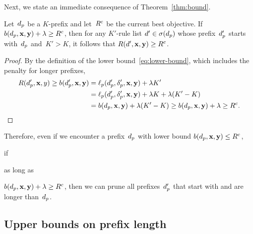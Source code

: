 Next, we state an immediate consequence of Theorem~\ref{thm:bound}.

\begin{lemma}
\label{lemma:lookahead}
Let~$d_p$ be a $K$-prefix
and let~${R^c}$ be the current best objective.
%
If ${b(d_p, \mathbf{x}, \mathbf{y}) + {\lambda} \ge {R^c}}$,
then for any $K'$-rule list ${{d}' \in \sigma(d_p)}$
whose prefix~$d_p'$ starts with~$d_p$ and~${K' > K}$,
it follows that ${R({d}', \mathbf{x}, \mathbf{y}) \ge {R^c}}$.
\end{lemma}

\begin{arxiv}
\begin{proof}
By the definition of the lower bound~\eqref{eq:lower-bound},
which includes the penalty for longer prefixes,
\begin{align}
R(d_p', \mathbf{x}, y) \ge b(d_p', \mathbf{x}, \mathbf{y}) &= \ell_p(d_p', \delta_p', \mathbf{x}, \mathbf{y}) + {\lambda} K' \nonumber \\
&= \ell_p(d_p', \delta_p', \mathbf{x}, \mathbf{y}) + {\lambda} K + {\lambda} (K' - K) \nonumber \\
&= b(d_p, \mathbf{x}, \mathbf{y}) + {\lambda} (K' - K)
\ge b(d_p, \mathbf{x}, \mathbf{y}) + {\lambda} \ge {R^c}.
\label{eq:lookahead}
\end{align}
\end{proof}
\end{arxiv}

Therefore, even if we encounter a prefix~$d_p$
with lower bound ${b(d_p, \mathbf{x}, \mathbf{y}) \le {R^c}}$,
\begin{kdd}
if
\end{kdd}
\begin{arxiv}
as long as
\end{arxiv}
${b(d_p, \mathbf{x}, \mathbf{y}) + {\lambda} \ge {R^c}}$, then we can prune
all prefixes~$d_p'$ that start with and are longer than~$d_p$.

\subsection{Upper bounds on prefix length}
\label{sec:ub-prefix-length}

